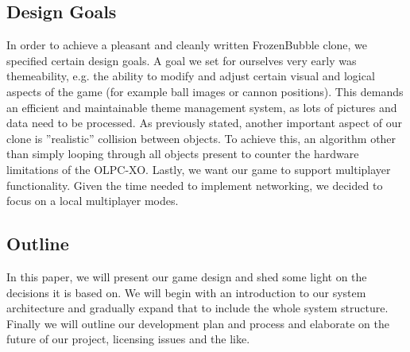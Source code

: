 \subsection{Design Goals}
In order to achieve a pleasant and cleanly written FrozenBubble clone, we specified certain design goals.
A goal we set for ourselves very early was themeability, e.g. the ability to modify and adjust certain visual and logical aspects of the game (for example ball images or cannon positions). This demands an efficient and maintainable theme management system, as lots of pictures and data need to be processed.
As previously stated, another important aspect of our clone is ''realistic'' collision between objects. To achieve this, an algorithm other than simply looping through all objects present to counter the hardware limitations of the OLPC-XO.
Lastly, we want our game to support multiplayer functionality. Given the time needed to implement networking, we decided to focus on a local multiplayer modes.
%
\subsection{Outline}
In this paper, we will present our game design and shed some light on the decisions 
it is based on. We will begin with an introduction to our system architecture and 
gradually expand that to include the whole system structure.\\
Finally we will outline our development plan and process and elaborate on the 
future of our project, licensing issues and the like.
%
